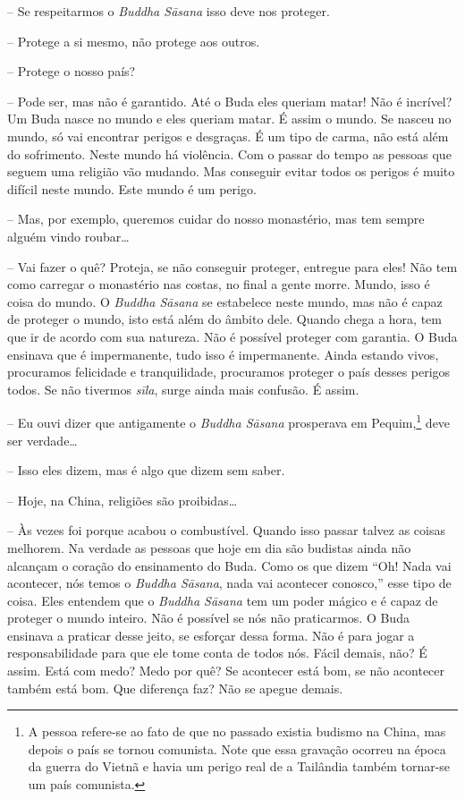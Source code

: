 -- Se respeitarmos o \textit{Buddha Sāsana} isso deve nos
proteger.

-- Protege a si mesmo, não protege aos outros.

-- Protege o nosso país?

-- Pode ser, mas não é garantido. Até o Buda eles queriam matar!
Não é incrível? Um Buda nasce no mundo e eles queriam matar. É assim o
mundo. Se nasceu no mundo, só vai encontrar perigos e desgraças. É um
tipo de carma, não está além do sofrimento. Neste mundo há violência.
Com o passar do tempo as pessoas que seguem uma religião vão mudando.
Mas conseguir evitar todos os perigos é muito difícil neste mundo. Este
mundo é um perigo.

-- Mas, por exemplo, queremos cuidar do nosso monastério, mas tem
sempre alguém vindo roubar…

-- Vai fazer o quê? Proteja, se não conseguir proteger, entregue
para eles! Não tem como carregar o monastério nas costas, no final a
gente morre. Mundo, isso é coisa do mundo. O \textit{Buddha Sāsana}
se estabelece neste mundo, mas não é capaz de proteger o mundo, isto
está além do âmbito dele. Quando chega a hora, tem que ir de acordo com
sua natureza. Não é possível proteger com garantia. O Buda ensinava que
é impermanente, tudo isso é impermanente. Ainda estando vivos,
procuramos felicidade e tranquilidade, procuramos proteger o país
desses perigos todos. Se não tivermos \textit{sīla}, surge ainda
mais confusão. É assim.

-- Eu ouvi dizer que antigamente o \textit{Buddha Sāsana
}prosperava em Pequim,\footnote{A pessoa refere-se ao fato de que no
passado existia budismo na China, mas depois o país se tornou
comunista. Note que essa gravação ocorreu na época da guerra do Vietnã
e havia um perigo real de a Tailândia também tornar-se um país
comunista.} deve ser verdade…

-- Isso eles dizem, mas é algo que dizem sem saber.

-- Hoje, na China, religiões são proibidas…

-- Às vezes foi porque acabou o combustível. Quando isso passar
talvez as coisas melhorem. Na verdade as pessoas que hoje em dia são
budistas ainda não alcançam o coração do ensinamento do Buda. Como os
que dizem “Oh! Nada vai acontecer, nós temos o \textit{Buddha
Sāsana}, nada vai acontecer conosco,” esse tipo de coisa. Eles
entendem que o \textit{Buddha Sāsana} tem um poder mágico e é capaz
de proteger o mundo inteiro. Não é possível se nós não praticarmos. O
Buda ensinava a praticar desse jeito, se esforçar dessa forma. Não é
para jogar a responsabilidade para que ele tome conta de todos nós.
Fácil demais, não? É assim. Está com medo? Medo por quê? Se acontecer
está bom, se não acontecer também está bom. Que diferença faz? Não se
apegue demais.

